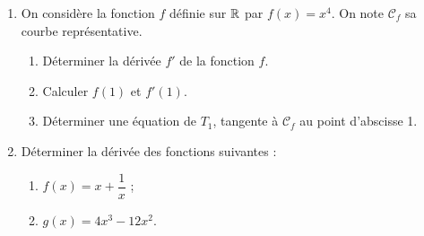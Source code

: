 \documentclass[a4paper,11pt]{article}
\begin{document}
\begin{enumerate}
	\item On considère la fonction $f$ définie sur $\R$ par $f(x)=x^4$. On note $\mathscr{C}_f$ sa courbe représentative.
	\begin{enumerate}
		\item Déterminer la dérivée $f'$ de la fonction $f$.
		\item Calculer $f(1)$ et $f'(1)$.
		\item Déterminer une équation de $T_1$, tangente à $\mathscr{C}_f$ au point d'abscisse 1.
	\end{enumerate}
	\item Déterminer la dérivée des fonctions suivantes :
	\begin{enumerate}
		\item $f(x)=x+\dfrac{1}{x}$ ;
		\item $g(x)=4x^3-12x^2$.
	\end{enumerate}
\end{enumerate}

~~
\end{document}
